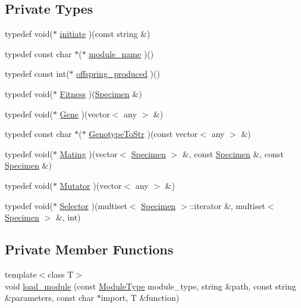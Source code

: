 \subsection*{Private Types}
\begin{CompactItemize}
\item 
typedef void($\ast$ \hyperlink{classPluginManager_b500db2879e847e3cf37918762255898}{initiate} )(const string \&)
\item 
typedef const char $\ast$($\ast$ \hyperlink{classPluginManager_95364d1fe57a2da74463958f77891e60}{module\_\-name} )()
\item 
typedef const int($\ast$ \hyperlink{classPluginManager_c8e3b761e36272f70ea015348474ca42}{offspring\_\-produced} )()
\item 
typedef void($\ast$ \hyperlink{classPluginManager_74536c0cfee914f6b592d185e9d8b004}{Fitness} )(\hyperlink{classSpecimen}{Specimen} \&)
\item 
typedef void($\ast$ \hyperlink{classPluginManager_fbd27663f74cd22c439cc0a365094d79}{Gene} )(vector$<$ any $>$ \&)
\item 
typedef const char $\ast$($\ast$ \hyperlink{classPluginManager_ed40a705dc64b5ebe14b9a29f2828241}{GenotypeToStr} )(const vector$<$ any $>$ \&)
\item 
typedef void($\ast$ \hyperlink{classPluginManager_b2707706d35a521a1c9c0c525b20b3a9}{Mating} )(vector$<$ \hyperlink{classSpecimen}{Specimen} $>$ \&, const \hyperlink{classSpecimen}{Specimen} \&, const \hyperlink{classSpecimen}{Specimen} \&)
\item 
typedef void($\ast$ \hyperlink{classPluginManager_00afabd8a9bbe0fd0c5b90294dc96a45}{Mutator} )(vector$<$ any $>$ \&)
\item 
typedef void($\ast$ \hyperlink{classPluginManager_64f7347436213b5c961891c7035947cc}{Selector} )(multiset$<$ \hyperlink{classSpecimen}{Specimen} $>$::iterator \&, multiset$<$ \hyperlink{classSpecimen}{Specimen} $>$ \&, int)
\end{CompactItemize}
\subsection*{Private Member Functions}
\begin{CompactItemize}
\item 
{\footnotesize template$<$class T$>$ }\\void \hyperlink{classPluginManager_df498f0e9054ae03f78927510905ec55}{load\_\-module} (const \hyperlink{ModuleType_8h_224128d35337e2b42cebf846d4d0c6f1}{ModuleType} module\_\-type, string \&path, const string \&parameters, const char $\ast$import, T \&function)
\end{CompactItemize}


